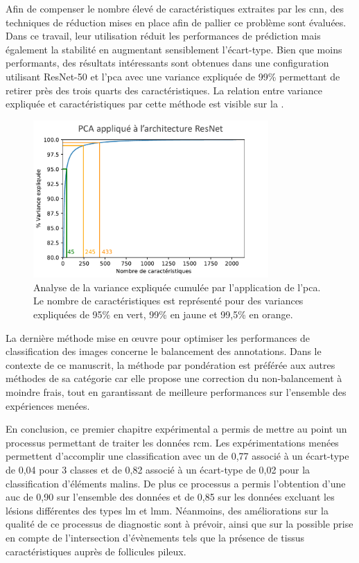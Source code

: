 Afin de compenser le nombre élevé de caractéristiques extraites par les \gls{cnn}, des techniques de réduction mises en place afin de pallier ce problème sont évaluées. Dans ce travail, leur utilisation réduit les performances de prédiction mais également la stabilité en augmentant sensiblement l'écart-type. Bien que moins performants, des résultats intéressants sont obtenues dans une configuration utilisant ResNet-50 et l'\gls{pca} avec une variance expliquée de 99\% permettant de retirer près des trois quarts des caractéristiques. La relation entre variance expliquée et caractéristiques par cette méthode est visible sur la .\par

\begin{figure}[H]
    \centering
    \includegraphics[width=0.8\textwidth]{contents/chapter_5/resources/results_image_classification_pca_variance.pdf}
    \caption{Analyse de la variance expliquée cumulée par l'application de l'\gls{pca}. Le nombre de caractéristiques est représenté pour des variances expliquées de 95\% en vert, 99\% en jaune et 99,5\% en orange.}
    \label{fig:results_image_classification_pca_variance}
\end{figure}\par

La dernière méthode mise en œuvre pour optimiser les performances de classification des images concerne le balancement des annotations. Dans le contexte de ce manuscrit, la méthode par pondération est préférée aux autres méthodes de sa catégorie car elle propose une correction du non-balancement à moindre frais, tout en garantissant de meilleure performances sur l'ensemble des expériences menées.\par

En conclusion, ce premier chapitre expérimental a permis de mettre au point un processus permettant de traiter les données \gls{rcm}. Les expérimentations menées permettent d'accomplir une classification avec un \fscore{} de 0,77 associé à un écart-type de 0,04 pour 3 classes et de 0,82 associé à un écart-type de 0,02 pour la classification d'éléments malins. De plus ce processus a permis l'obtention d'une \gls{auc} de 0,90 sur l'ensemble des données et de 0,85 sur les données excluant les lésions différentes des types \gls{lm} et \gls{lmm}. Néanmoins, des améliorations sur la qualité de ce processus de diagnostic sont à prévoir, ainsi que sur la possible prise en compte de l'intersection d'évènements tels que la présence de tissus caractéristiques auprès de follicules pileux.\par